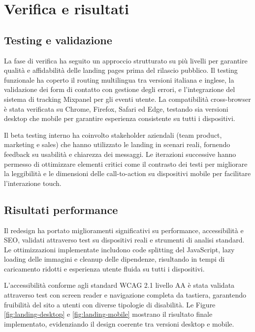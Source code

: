 \chapter{Verifica e risultati}

\section{Testing e validazione}

La fase di verifica ha seguito un approccio strutturato su più livelli per 
garantire qualità e affidabilità delle landing pages prima del rilascio 
pubblico. Il testing funzionale ha coperto il routing multilingua tra versioni 
italiana e inglese, la validazione dei form di contatto con gestione degli 
errori, e l'integrazione del sistema di tracking Mixpanel per gli eventi utente. 
La compatibilità cross-browser è stata verificata su Chrome, Firefox, Safari ed 
Edge, testando sia versioni desktop che mobile per garantire esperienza 
consistente su tutti i dispositivi.

Il beta testing interno ha coinvolto stakeholder aziendali (team product, 
marketing e sales) che hanno utilizzato le landing in scenari reali, fornendo 
feedback su usabilità e chiarezza dei messaggi. Le iterazioni successive hanno 
permesso di ottimizzare elementi critici come il contrasto dei testi per 
migliorare la leggibilità e le dimensioni delle call-to-action su dispositivi 
mobile per facilitare l'interazione touch.

\section{Risultati performance}

Il redesign ha portato miglioramenti significativi su performance, accessibilità 
e SEO, validati attraverso test su dispositivi reali e strumenti di analisi 
standard. Le ottimizzazioni implementate includono code splitting del JavaScript, 
lazy loading delle immagini e cleanup delle dipendenze, risultando in tempi di 
caricamento ridotti e esperienza utente fluida su tutti i dispositivi.

L'accessibilità conforme agli standard WCAG 2.1 livello AA è stata validata 
attraverso test con screen reader e navigazione completa da tastiera, garantendo 
fruibilità del sito a utenti con diverse tipologie di disabilità. Le Figure 
\ref{fig:landing-desktop} e \ref{fig:landing-mobile} mostrano il risultato finale 
implementato, evidenziando il design coerente tra versioni desktop e mobile.

